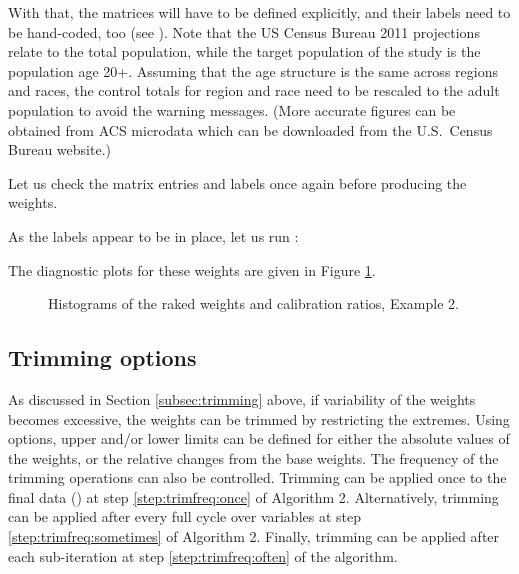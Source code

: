 \begin{stexample}[Example 2]
With that, the matrices will have to be defined explicitly,
and their labels need to be hand-coded, too (see ).
Note that the US Census Bureau 2011
projections relate to the total population, while the target population
of the study is the population age 20+. Assuming that the age structure
is the same across regions and races, the control totals for region and race
need to be rescaled to the adult population to avoid the warning messages.
(More accurate figures can be obtained from ACS microdata which can be downloaded
from the U.S.\ Census Bureau website.)

\begin{stlog}
\nullskip
\end{stlog}

Let us check the matrix entries and labels once again before
producing the weights.

\begin{stlog}
\nullskip
\end{stlog}

As the labels appear to be in place, let us run :

\begin{stlog}
\nullskip
\end{stlog}

The diagnostic plots for these weights are given in Figure \ref{fig:example2}.

\begin{figure}[h!]
\begin{center}
\end{center}
\caption{Histograms of the raked weights and calibration ratios, Example 2.}
\label{fig:example2}
\end{figure}

\end{stexample}

\subsection{Trimming options}
\label{subsec:example:trimming}


As discussed in Section \ref{subsec:trimming} above, if variability of the weights
becomes excessive, the weights can be trimmed by restricting the extremes.
Using  options, upper and/or lower limits can be defined
for either the absolute values of the weights, or the relative changes from
the base weights. The frequency of the trimming operations can also be controlled.
Trimming can be applied once to the final data ()
at step \ref{step:trimfreq:once} of Algorithm 2. 
Alternatively, trimming can be applied after every full cycle over variables
at step \ref{step:trimfreq:sometimes} of Algorithm 2.
Finally, trimming can be applied after each sub-iteration 
at step \ref{step:trimfreq:often} of the algorithm.

